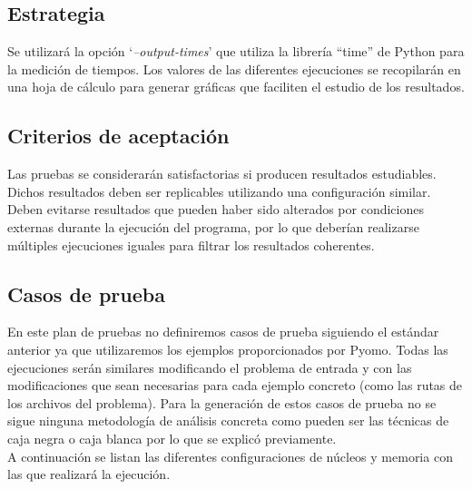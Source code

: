 \subsection{Estrategia}

Se utilizará la opción `\textit{--output-times}' que utiliza la librería ``time'' de Python para la medición de tiempos. Los valores de las diferentes ejecuciones se recopilarán en una hoja de cálculo para generar gráficas que faciliten el estudio de los resultados.

\subsection{Criterios de aceptación}

Las pruebas se considerarán satisfactorias si producen resultados estudiables. Dichos resultados deben ser replicables utilizando una configuración similar. Deben evitarse resultados que pueden haber sido alterados por condiciones externas durante la ejecución del programa, por lo que deberían realizarse múltiples ejecuciones iguales para filtrar los resultados coherentes.

\subsection{Casos de prueba}

En este plan de pruebas no definiremos casos de prueba siguiendo el estándar anterior ya que utilizaremos los ejemplos proporcionados por Pyomo. Todas las ejecuciones serán similares modificando el problema de entrada y con las modificaciones que sean necesarias para cada ejemplo concreto (como las rutas de los archivos del problema). Para la generación de estos casos de prueba no se sigue ninguna metodología de análisis concreta como pueden ser las técnicas de caja negra o caja blanca por lo que se explicó previamente.\\

A continuación se listan las diferentes configuraciones de núcleos y memoria con las que realizará la ejecución.

